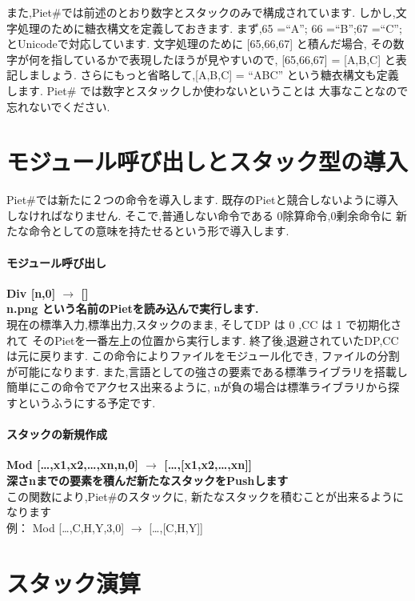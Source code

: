また,Piet\#では前述のとおり数字とスタックのみで構成されています.
しかし,文字処理のために糖衣構文を定義しておきます. まず,65 =``A''; 66
=``B'';67 =``C'';とUnicodeで対応しています. 文字処理のために
{[}65,66,67{]} と積んだ場合,
その数字が何を指しているかで表現したほうが見やすいので, {[}65,66,67{]} =
{[}A,B,C{]} と表記しましょう. さらにもっと省略して,{[}A,B,C{]} = ``ABC''
という糖衣構文も定義します. Piet\#
では数字とスタックしか使わないということは
大事なことなので忘れないでください.　　

\section{モジュール呼び出しとスタック型の導入}

Piet\#では新たに２つの命令を導入します.
既存のPietと競合しないように導入しなければなりません.
そこで,普通しない命令である 0除算命令,0剰余命令に
新たな命令としての意味を持たせるという形で導入します.

\paragraph{モジュール呼び出し}

\textbf{Div {[}n,0{]} $\to$ {[}{]}}\\\textbf{n.png
という名前のPietを読み込んで実行します.}\\現在の標準入力,標準出力,スタックのまま,
そしてDP は 0 ,CC は 1 で初期化されて
そのPietを一番左上の位置から実行します.
終了後,退避されていたDP,CCは元に戻ります.
この命令によりファイルをモジュール化でき,
ファイルの分割が可能になります.
また,言語としての強さの要素である標準ライブラリを搭載し
簡単にこの命令でアクセス出来るように,
nが負の場合は標準ライブラリから探すというふうにする予定です.

\paragraph{スタックの新規作成}

\textbf{Mod {[}\ldots{},x1,x2,\ldots{},xn,n,0{]} $\to$
{[}\ldots{},{[}x1,x2,\ldots{},xn{]}{]}}\\\textbf{深さnまでの要素を積んだ新たなスタックをPushします}\\この関数により,Piet\#のスタックに,
新たなスタックを積むことが出来るようになります\\例： Mod
{[}\ldots{},C,H,Y,3,0{]} $\to$ {[}\ldots{},{[}C,H,Y{]}{]}

\section{スタック演算}

